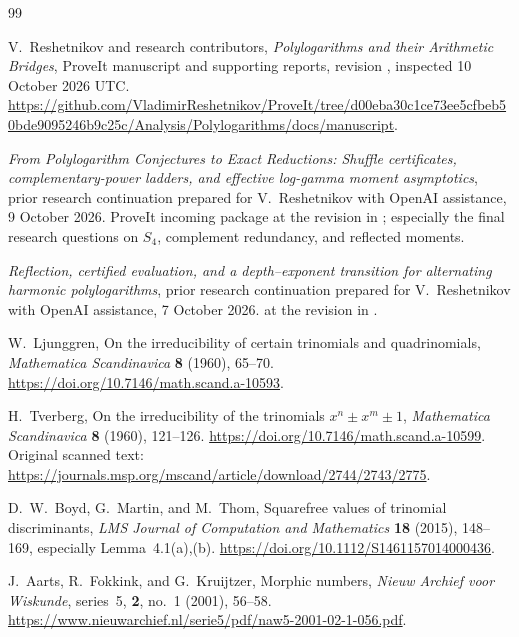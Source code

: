 \begin{thebibliography}{99}
V.~Reshetnikov and research contributors,
\emph{Polylogarithms and their Arithmetic Bridges},
ProveIt manuscript and supporting reports, revision
, inspected 10 October 2026 UTC.
\url{https://github.com/VladimirReshetnikov/ProveIt/tree/d00eba30c1ce73ee5cfbeb50bde9095246b9c25c/Analysis/Polylogarithms/docs/manuscript}.

\emph{From Polylogarithm Conjectures to Exact Reductions:
Shuffle certificates, complementary-power ladders, and effective
log-gamma moment asymptotics}, prior research continuation prepared for
V.~Reshetnikov with OpenAI assistance, 9 October 2026.
ProveIt incoming package
at the revision in \cite{repoManuscript}; especially the final research
questions on $S_4$, complement redundancy, and reflected moments.

\emph{Reflection, certified evaluation, and a depth--exponent transition
for alternating harmonic polylogarithms}, prior research continuation
prepared for V.~Reshetnikov with OpenAI assistance, 7 October 2026.
at the revision in \cite{repoManuscript}.

W.~Ljunggren, On the irreducibility of certain trinomials and
quadrinomials, \emph{Mathematica Scandinavica} \textbf{8} (1960),
65--70. \url{https://doi.org/10.7146/math.scand.a-10593}.

H.~Tverberg, On the irreducibility of the trinomials
$x^n\pm x^m\pm1$, \emph{Mathematica Scandinavica} \textbf{8}
(1960), 121--126.
\url{https://doi.org/10.7146/math.scand.a-10599}.
Original scanned text:
\url{https://journals.msp.org/mscand/article/download/2744/2743/2775}.

D.~W.~Boyd, G.~Martin, and M.~Thom,
Squarefree values of trinomial discriminants,
\emph{LMS Journal of Computation and Mathematics} \textbf{18}
(2015), 148--169, especially Lemma~4.1(a),(b).
\url{https://doi.org/10.1112/S1461157014000436}.

J.~Aarts, R.~Fokkink, and G.~Kruijtzer, Morphic numbers,
\emph{Nieuw Archief voor Wiskunde}, series~5, \textbf{2}, no.~1
(2001), 56--58.
\url{https://www.nieuwarchief.nl/serie5/pdf/naw5-2001-02-1-056.pdf}.


\end{thebibliography}
